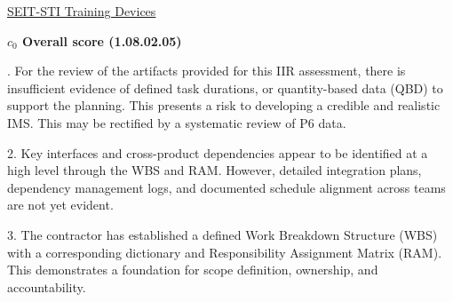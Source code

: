 % 


\begin{frame}{\href{run:../local/source-docs/1.08.02.05.pdf}{SEIT-STI Training Devices}}
\centering
{}
\par
\vspace{0.75em}
\textbf{\small{\(c_0\) Overall score {\tiny (1.08.02.05)}}}\\\par
\vspace{0.5em}
\begin{minipage}{0.85\textwidth}
\raggedright
\fontsize{7}{9}. For the review of the artifacts provided for this IIR assessment, there is insufficient evidence of defined task durations, or quantity-based data (QBD) to support the planning. This presents a risk to developing a credible and realistic IMS. This may be rectified by a systematic review of P6 data.\par\vspace{0.5em}2. Key interfaces and cross-product dependencies appear to be identified at a high level through the WBS and RAM. However, detailed integration plans, dependency management logs, and documented schedule alignment across teams are not yet evident.\par\vspace{0.5em}3. The contractor has established a defined Work Breakdown Structure (WBS) with a corresponding dictionary and Responsibility Assignment Matrix (RAM). This demonstrates a foundation for scope definition, ownership, and accountability.\par
\end{minipage}
\end{frame}
